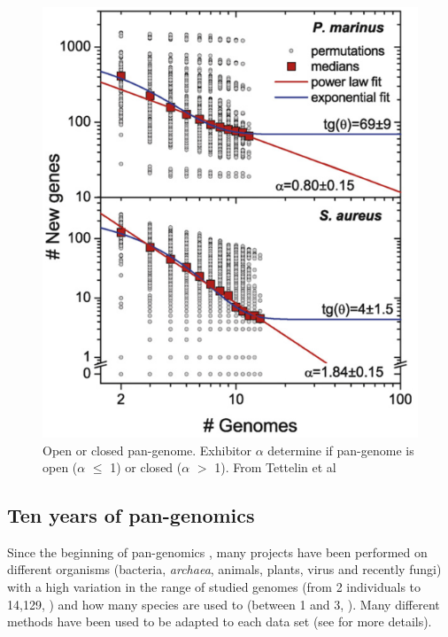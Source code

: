 \documentclass[a4paper,10pt,twoside]{report}
\begin{document}
\begin{figure}[h]
\centering
 \includegraphics[scale=0.5]{Tettelin2088_OpenAndClosedPanGenome.png}
 \caption[Open or closed pan-genome]{Open or closed pan-genome. Exhibitor $\alpha$ determine if pan-genome is open ($\alpha$ $\leq$ 1) or closed ($\alpha$ $>$ 1).
From Tettelin et al \cite{Tettelin2008}}
 \label{openOrClosed}
\end{figure}

\subsection{Ten years of pan-genomics}
Since the beginning of pan-genomics \cite{Tettelin2005}, many projects have been performed on different organisms (bacteria, \textit{archaea}, animals, plants, virus and recently fungi) with a high variation in the range of studied genomes (from 2 individuals to 14,129, \cite{Lu2015}) and how many species are used to (between 1 and 3, \cite{Darling2010, Gordienko2013, Boussaha2015, Ghatak2016}). Many different methods have been used to be adapted to each data set (see \cite{Vernikos2015} for more details). \\
\end{document}
